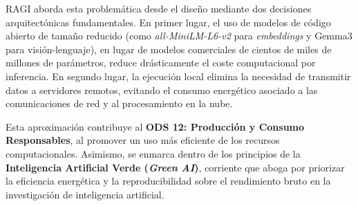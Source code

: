 \documentclass[../main.tex]{subfiles}
\begin{document}
RAGI aborda esta problemática desde el diseño mediante dos decisiones arquitectónicas fundamentales. En primer lugar, el uso de modelos de código abierto de tamaño reducido (como \textit{all-MiniLM-L6-v2} para \textit{embeddings} y Gemma3 para visión-lenguaje), en lugar de modelos comerciales de cientos de miles de millones de parámetros, reduce drásticamente el coste computacional por inferencia. En segundo lugar, la ejecución local elimina la necesidad de transmitir datos a servidores remotos, evitando el consumo energético asociado a las comunicaciones de red y al procesamiento en la nube.

Esta aproximación contribuye al \textbf{ODS 12: Producción y Consumo Responsables}, al promover un uso más eficiente de los recursos computacionales. Asimismo, se enmarca dentro de los principios de la \textbf{Inteligencia Artificial Verde (\textit{Green AI})}, corriente que aboga por priorizar la eficiencia energética y la reproducibilidad sobre el rendimiento bruto en la investigación de inteligencia artificial.
\end{document}
